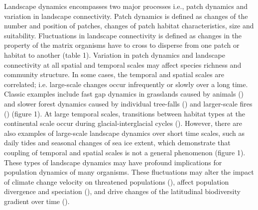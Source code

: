 \documentclass[12pt]{article}
\begin{document}
Landscape dynamics encompasses two major processes i.e., patch dynamics and variation in landscape connectivity. Patch dynamics is defined as changes of the number and position of patches, changes of patch habitat characteristics, size and suitability. Fluctuations in landscape connectivity is defined as changes in the property of the matrix organisms have to cross to disperse from one patch or habitat to another (table 1). Variation in patch dynamics and landscape connectivity at all spatial and temporal scales may affect species richness and community structure. In some cases, the temporal and spatial scales are correlated; i.e. large-scale changes occur infrequently or slowly over a long time. Classic examples include fast gap dynamics in grasslands caused by animals (\cite{WhickerDetling1988, HobbsMooney1991, MiltonEtAl1997}) and slower forest dynamics caused by individual tree-falls (\cite{Goldblum1997}) and larger-scale fires (\cite{VanWagnerEtAl2006, WhelanEtAl2013}) (figure 1). At large temporal scales, transitions between habitat types at the continental scale occur during glacial-interglacial cycles (\cite{WerneckEtAl2011}). However, there are also examples of large-scale landscape dynamics over short time scales, such as daily tides and seasonal changes of sea ice extent, which demonstrate that coupling of temporal and spatial scales is not a general phenomenon (figure 1). These types of landscape dynamics may have profound implications for population dynamics of many organisms. These fluctuations may alter the impact of climate change velocity on threatened populations (\cite{loarieetal2009}), affect population divergence and speciation (\cite{aguileetal2011}), and drive changes of the latitudinal biodiversity gradient over time (\cite{mannionetal2014}).
\end{document}
